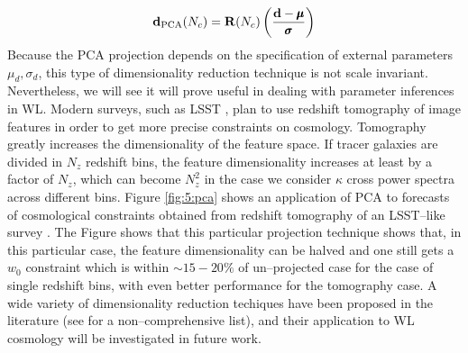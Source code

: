 \begin{equation}
\label{eq:5:pca-projection}
\mathbf{d}_{\rm PCA}(N_c) = \mathbf{R}(N_c)\left(\frac{\mathbf{d}-\pmb{\mu}}{\pmb{\sigma}}\right)
\end{equation}
%
Because the PCA projection depends on the specification of external parameters $\mu_d,\sigma_d$, this type of dimensionality reduction technique is not scale invariant. Nevertheless, we will see it will prove useful in dealing with parameter inferences in WL. Modern surveys, such as LSST \citep{LSST}, plan to use redshift tomography of image features in order to get more precise constraints on cosmology. Tomography greatly increases the dimensionality of the feature space. If tracer galaxies are divided in $N_z$ redshift bins, the feature dimensionality increases at least by a factor of $N_z$, which can become $N_z^2$ in the case we consider $\kappa$ cross power spectra across different bins. Figure \ref{fig:5:pca} shows an application of PCA to forecasts of cosmological constraints obtained from redshift tomography of an LSST--like survey \citep{PetriPhotoZ}. The Figure shows that this particular projection technique shows that, in this particular case, the feature dimensionality can be halved and one still gets a $w_0$ constraint which is within $\sim 15-20\%$ of un--projected case for the case of single redshift bins, with even better performance for the tomography case. A wide variety of dimensionality reduction techiques have been proposed in the literature (see \citep{astroMLText} for a non--comprehensive list), and their application to WL cosmology will be investigated in future work.  

